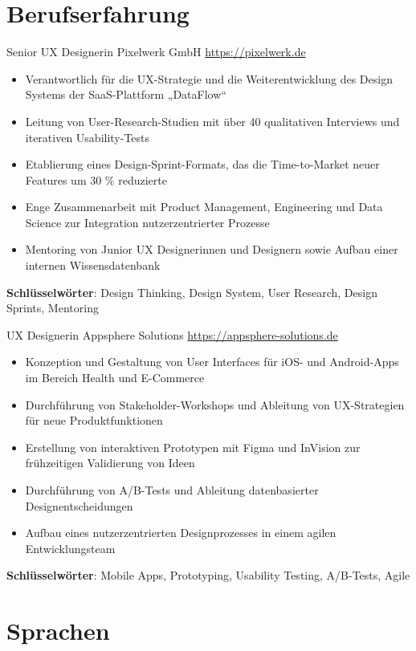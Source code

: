 \documentclass[a4paper, serif, 10pt]{moderncv}
\begin{document}
\section{Berufserfahrung}

        {Senior UX Designerin}
        {Pixelwerk GmbH}
        {\url{https://pixelwerk.de}}
        {}
        {\begin{itemize}
\item Verantwortlich für die UX-Strategie und die Weiterentwicklung des Design Systems der SaaS-Plattform „DataFlow“
\item Leitung von User-Research-Studien mit über 40 qualitativen Interviews und iterativen Usability-Tests
\item Etablierung eines Design-Sprint-Formats, das die Time-to-Market neuer Features um 30 \% reduzierte
\item Enge Zusammenarbeit mit Product Management, Engineering und Data Science zur Integration nutzerzentrierter Prozesse
\item Mentoring von Junior UX Designerinnen und Designern sowie Aufbau einer internen Wissensdatenbank
\end{itemize}
\textbf{Schlüsselwörter}: Design Thinking, Design System, User Research, Design Sprints, Mentoring}

        {UX Designerin}
        {Appsphere Solutions}
        {\url{https://appsphere-solutions.de}}
        {}
        {\begin{itemize}
\item Konzeption und Gestaltung von User Interfaces für iOS- und Android-Apps im Bereich Health und E-Commerce
\item Durchführung von Stakeholder-Workshops und Ableitung von UX-Strategien für neue Produktfunktionen
\item Erstellung von interaktiven Prototypen mit Figma und InVision zur frühzeitigen Validierung von Ideen
\item Durchführung von A/B-Tests und Ableitung datenbasierter Designentscheidungen
\item Aufbau eines nutzerzentrierten Designprozesses in einem agilen Entwicklungsteam
\end{itemize}
\textbf{Schlüsselwörter}: Mobile Apps, Prototyping, Usability Testing, A/B-Tests, Agile}
\section{Sprachen}
\end{document}
